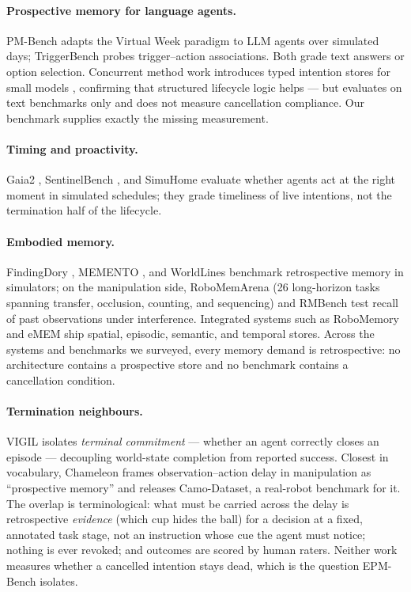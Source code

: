 \documentclass{article} %
\begin{document}
\paragraph{Prospective memory for language agents.}
PM-Bench \citep{pmbench} adapts the Virtual Week paradigm to LLM agents over
simulated days; TriggerBench \citep{triggerbench} probes trigger--action
associations. Both grade text answers or option selection. Concurrent method
work introduces typed intention stores for small models \citep{pis2026},
confirming that structured lifecycle logic helps --- but evaluates on text
benchmarks only and does not measure cancellation compliance. Our benchmark
supplies exactly the missing measurement.

\paragraph{Timing and proactivity.}
Gaia2 \citep{gaia2}, SentinelBench \citep{sentinel}, and SimuHome
\citep{simuhome} evaluate whether agents act at the right moment in simulated
schedules; they grade timeliness of live intentions, not the termination half
of the lifecycle.

\paragraph{Embodied memory.}
FindingDory \citep{findingdory}, MEMENTO \citep{memento}, and WorldLines
\citep{worldlines} benchmark retrospective memory in simulators; on the
manipulation side, RoboMemArena \citep{robomemarena} (26 long-horizon tasks
spanning transfer, occlusion, counting, and sequencing) and RMBench
\citep{rmbench} test recall of past observations under interference.
Integrated systems such as RoboMemory \citep{robomemory} and eMEM \citep{emem}
ship spatial, episodic, semantic, and temporal stores. Across the systems and
benchmarks we surveyed, every memory demand is retrospective: no architecture
contains a prospective store and no benchmark contains a cancellation
condition.

\paragraph{Termination neighbours.}
VIGIL \citep{vigil} isolates \emph{terminal commitment} --- whether an agent
correctly closes an episode --- decoupling world-state completion from reported
success. Closest in vocabulary, Chameleon \citep{chameleon} frames
observation--action delay in manipulation as ``prospective memory'' and
releases Camo-Dataset, a real-robot benchmark for it. The overlap is
terminological: what must be carried across the delay is retrospective
\emph{evidence} (which cup hides the ball) for a decision at a fixed,
annotated task stage, not an instruction whose cue the agent must notice;
nothing is ever revoked; and outcomes are scored by human raters. Neither work
measures whether a cancelled intention stays dead, which is the question
EPM-Bench isolates.
\end{document}
